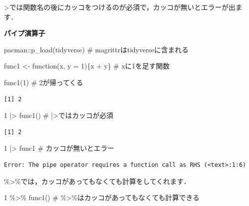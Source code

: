 \documentclass[
  letterpaper,
  DIV=11,
  numbers=noendperiod]{scrreprt}
\newenvironment{Shaded}{\begin{snugshade}}{\end{snugshade}}
\newcommand{\AttributeTok}[1]{\textcolor[rgb]{0.40,0.45,0.13}{#1}}
\newcommand{\CommentTok}[1]{\textcolor[rgb]{0.37,0.37,0.37}{#1}}
\newcommand{\ControlFlowTok}[1]{\textcolor[rgb]{0.00,0.23,0.31}{#1}}
\newcommand{\DecValTok}[1]{\textcolor[rgb]{0.68,0.00,0.00}{#1}}
\newcommand{\FunctionTok}[1]{\textcolor[rgb]{0.28,0.35,0.67}{#1}}
\newcommand{\NormalTok}[1]{\textcolor[rgb]{0.00,0.23,0.31}{#1}}
\newcommand{\OtherTok}[1]{\textcolor[rgb]{0.00,0.23,0.31}{#1}}
\newcommand{\SpecialCharTok}[1]{\textcolor[rgb]{0.37,0.37,0.37}{#1}}
\begin{document}
\textbar\textgreater では関数名の後にカッコをつけるのが必須で，カッコが無いとエラーが出ます．

\textbf{パイプ演算子}

\begin{Shaded}
\begin{Highlighting}[]
\NormalTok{pacman}\SpecialCharTok{::}\FunctionTok{p\_load}\NormalTok{(tidyverse) }\CommentTok{\# magrittrはtidyverseに含まれる}

\NormalTok{func1 }\OtherTok{\textless{}{-}} \ControlFlowTok{function}\NormalTok{(x, }\AttributeTok{y =} \DecValTok{1}\NormalTok{)\{x }\SpecialCharTok{+}\NormalTok{ y\} }\CommentTok{\# xに1を足す関数}

\FunctionTok{func1}\NormalTok{(}\DecValTok{1}\NormalTok{) }\CommentTok{\# 2が帰ってくる}
\end{Highlighting}
\end{Shaded}

\begin{verbatim}
[1] 2
\end{verbatim}

\begin{Shaded}
\begin{Highlighting}[]
\DecValTok{1} \SpecialCharTok{|\textgreater{}} \FunctionTok{func1}\NormalTok{() }\CommentTok{\# |\textgreater{}ではカッコが必須}
\end{Highlighting}
\end{Shaded}

\begin{verbatim}
[1] 2
\end{verbatim}

\begin{Shaded}
\begin{Highlighting}[]
\DecValTok{1} \SpecialCharTok{|\textgreater{}}\NormalTok{ func1 }\CommentTok{\# カッコが無いとエラー}
\end{Highlighting}
\end{Shaded}

\begin{verbatim}
Error: The pipe operator requires a function call as RHS (<text>:1:6)
\end{verbatim}

\%\textgreater\%では，カッコがあってもなくても計算をしてくれます．

\begin{Shaded}
\begin{Highlighting}[]
\DecValTok{1} \SpecialCharTok{\%\textgreater{}\%} \FunctionTok{func1}\NormalTok{() }\CommentTok{\# \%\textgreater{}\%はカッコがあってもなくても計算できる}
\end{Highlighting}
\end{Shaded}
\end{document}
